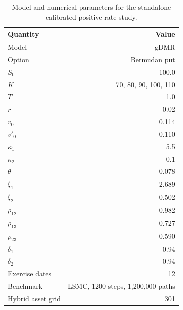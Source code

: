\begin{table}[htbp]
\centering
\caption{Model and numerical parameters for the standalone calibrated positive-rate study.}
\label{tab:bgk_r02_calibrated_t1_nex12-experimental-setting}
\begin{tabular}{lr}
\toprule
Quantity & Value \\
\midrule
Model & gDMR \\
Option & Bermudan put \\
$S_0$ & 100.0 \\
$K$ & 70, 80, 90, 100, 110 \\
$T$ & 1.0 \\
$r$ & 0.02 \\
$v_0$ & 0.114 \\
$v'_0$ & 0.110 \\
$\kappa_1$ & 5.5 \\
$\kappa_2$ & 0.1 \\
$\theta$ & 0.078 \\
$\xi_1$ & 2.689 \\
$\xi_2$ & 0.502 \\
$\rho_{12}$ & -0.982 \\
$\rho_{13}$ & -0.727 \\
$\rho_{23}$ & 0.590 \\
$\delta_1$ & 0.94 \\
$\delta_2$ & 0.94 \\
Exercise dates & 12 \\
Benchmark & LSMC, 1200 steps, 1,200,000 paths \\
Hybrid asset grid & 301 \\
\bottomrule
\end{tabular}
\end{table}
